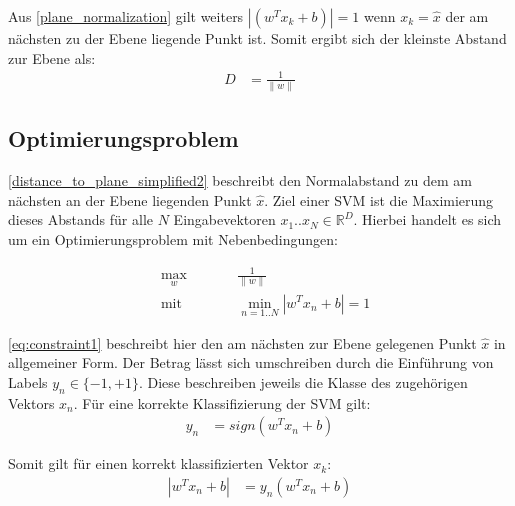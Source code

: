 \documentclass[a4paper,11pt,twoside]{scrreprt}
\newcommand{\norm}[1]{\lVert#1\rVert}
\begin{document}
Aus \autoref{plane_normalization} gilt weiters $| (w^{T} x_{k} + b) | = 1$ wenn $x_{k} = \hat{x}$ der am nächsten zu der Ebene liegende Punkt ist. Somit ergibt sich der kleinste Abstand zur Ebene als:
\begin{equation} \label{distance_to_plane_simplified2}
	\begin{aligned}
		D &= \frac{1}{\norm{w}}
	\end{aligned}
\end{equation}

\subsection{Optimierungsproblem}

\autoref{distance_to_plane_simplified2} beschreibt den Normalabstand zu dem am nächsten an der Ebene liegenden Punkt $\hat{x}$. Ziel einer \ac{SVM} ist die Maximierung dieses Abstands für alle $N$ Eingabevektoren $x_{1}..x_{N} \in \mathbb{R}^{D}$. Hierbei handelt es sich um ein Optimierungsproblem mit Nebenbedingungen:

\begin{subequations}
	\begin{alignat}{2}
		&\!\max_{w}        &\qquad&  \frac{1}{\norm{w}} \label{eq:optProb}\\
		&\text{mit } &      & \min_{n=1..N} |w^{T} x_{n} + b| = 1 \label{eq:constraint1}
	\end{alignat}
\end{subequations}

\autoref{eq:constraint1} beschreibt hier den am nächsten zur Ebene gelegenen Punkt $\hat{x}$ in allgemeiner Form. Der Betrag lässt sich umschreiben durch die Einführung von Labels $y_{n} \in \{-1, +1\}$. Diese beschreiben jeweils die Klasse des zugehörigen Vektors $x_{n}$. Für eine korrekte Klassifizierung der \ac{SVM} gilt:
\begin{equation} \label{svm_classif}
	\begin{aligned}
		y_{n} &= sign(w^{T} x_{n} + b)
	\end{aligned}
\end{equation}

Somit gilt für einen korrekt klassifizierten Vektor $x_{k}$:
\begin{equation} \label{abs_value_trick}
	\begin{aligned}
		|w^{T} x_{n} + b| &= y_{n} (w^{T} x_{n} + b)
	\end{aligned}
\end{equation}
\end{document}
